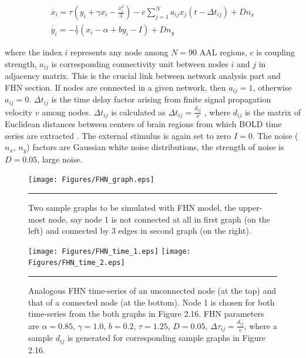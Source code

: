 \begin{subequations}
 \begin{align}\dot{x_i} = \tau (y_i + \gamma x_i - \frac{x_i^3}{3}) -c \sum_{j=1}^N a_{ij}x_j(t - \Delta t_{ij}) +Dn_x \label{eqn: frobenius 17}\\  \dot{y_i} = -\frac{1}{\tau} (x_i - \alpha + b y_i - I ) +Dn_y \label{eqn: frobenius 18}   \end{align} 
\end{subequations}

where the index $i$ represents any node among $N=90$ AAL regions, $c$ is coupling strength, $a_{ij}$ is corresponding connectivity unit between nodes $i$ and $j$ in adjacency matrix. This is the crucial link between network analysis part and FHN section. If nodes are connected in a given network, then $a_{ij}=1$, otherwise $a_{ij}=0$. $\Delta t_{ij}$ is the time delay factor arising from finite signal propagation velocity $v$ among nodes. $\Delta t_{ij}$ is calculated as $\Delta t_{ij}=\frac{d_{ij}}{\nu}$ \citep{GHO08, GHO08a, DEC09}, where $d_{ij}$ is the matrix of Euclidean distances between centers of brain regions from which BOLD time series are extracted \citep{KAI06}. The external stimulus is again set to zero $I=0$. The noise ($n_x$, $n_y$) factors are Gaussian white noise distributions, the strength of noise is $D=0.05$, large noise.
 
\begin{figure}[htbp]
  \centering
	\texttt{[image: Figures/FHN\_graph.eps]}
 
    \rule{35em}{0.5pt}
    \caption[FHN Graph]{Two sample graphs to be simulated with FHN model, the upper-most node, say node 1 is not connected at all in first graph (on the left) and connected by 3 edges in second graph (on the right).  }
  \label{fig:FHN Graph}	
\end{figure}


\begin{figure}[htbp]
  \centering
	\texttt{[image: Figures/FHN\_time\_1.eps]}
 	\texttt{[image: Figures/FHN\_time\_2.eps]}
    \rule{35em}{0.5pt}
    \caption[FHN Time Series]{Analogous FHN time-series of an unconnected node (at the top) and that of a connected node (at the bottom). Node 1 is chosen for both time-series from the both graphs in Figure 2.16. FHN parameters are  $\alpha=0.85$, $\gamma=1.0$, $b=0.2$, $\tau=1.25$, $D=0.05$, $\Delta \tau_{ij} = \frac{ d_{ij}}{v}$, where a sample $d_{ij}$ is generated for corresponding sample graphs in Figure 2.16.  }
  \label{fig:FHN Time Series}	
\end{figure}

